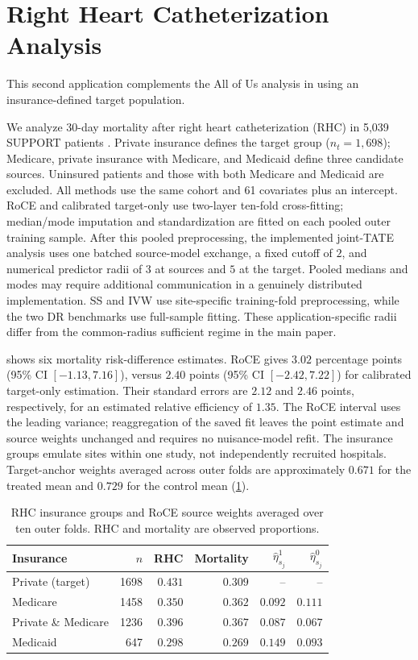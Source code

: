 \documentclass[12pt]{article}
\begin{document}
\section{Right Heart Catheterization Analysis}\label{supp:rhc}
This second application complements the All of Us analysis in  using an insurance-defined target population.

We analyze 30-day mortality after right heart catheterization (RHC) in 5,039 SUPPORT patients \citep{connors1996effectiveness,hirano2001estimation}. Private insurance defines the target group ($n_t=1{,}698$); Medicare, private insurance with Medicare, and Medicaid define three candidate sources. Uninsured patients and those with both Medicare and Medicaid are excluded. All methods use the same cohort and 61 covariates plus an intercept. RoCE and calibrated target-only use two-layer ten-fold cross-fitting; median/mode imputation and standardization are fitted on each pooled outer training sample. After this pooled preprocessing, the implemented joint-TATE analysis uses one batched source-model exchange, a fixed cutoff of $2$, and numerical predictor radii of $3$ at sources and $5$ at the target. Pooled medians and modes may require additional communication in a genuinely distributed implementation. SS and IVW use site-specific training-fold preprocessing, while the two DR benchmarks use full-sample fitting. These application-specific radii differ from the common-radius sufficient regime in the main paper.

 shows six mortality risk-difference estimates. RoCE gives $3.02$ percentage points (95\% CI $[-1.13,7.16]$), versus $2.40$ points (95\% CI $[-2.42,7.22]$) for calibrated target-only estimation. Their standard errors are $2.12$ and $2.46$ points, respectively, for an estimated relative efficiency of $1.35$. The RoCE interval uses the leading variance; reaggregation of the saved fit leaves the point estimate and source weights unchanged and requires no nuisance-model refit. The insurance groups emulate sites within one study, not independently recruited hospitals. Target-anchor weights averaged across outer folds are approximately $0.671$ for the treated mean and $0.729$ for the control mean (\cref{tab:rhc_sites}).

\begin{table}[!htbp]
\centering
\caption{RHC insurance groups and RoCE source weights averaged over ten outer folds. RHC and mortality are observed proportions.}
\label{tab:rhc_sites}
\begin{tabular}{lrrrrr}
\toprule
Insurance & $n$ & RHC & Mortality & $\widehat\eta_{s_j}^1$ & $\widehat\eta_{s_j}^0$\\
\midrule
Private (target) & 1698 & $0.431$ & $0.309$ & -- & --\\
Medicare & 1458 & $0.350$ & $0.362$ & $0.092$ & $0.111$\\
Private \& Medicare & 1236 & $0.396$ & $0.367$ & $0.087$ & $0.067$\\
Medicaid & 647 & $0.298$ & $0.269$ & $0.149$ & $0.093$\\
\bottomrule
\end{tabular}
\end{table}
\end{document}
